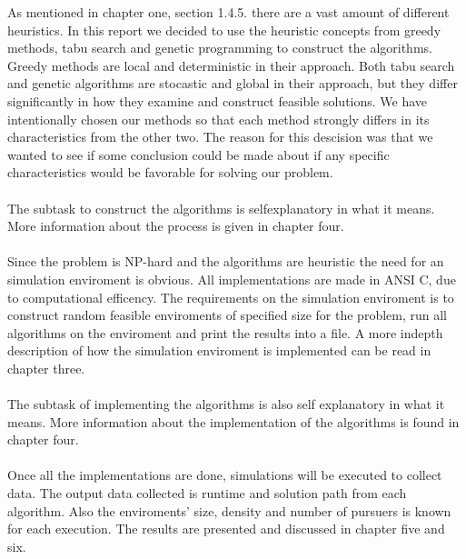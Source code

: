 As mentioned in chapter one, section 1.4.5. there are a vast amount of different heuristics. In this report we decided to use the heuristic concepts from greedy methods, tabu search and genetic programming to construct the algorithms. Greedy methods are local and deterministic in their approach. Both tabu search and genetic algorithms are stocastic and global in their approach, but they differ significantly in how they examine and construct feasible solutions. We have intentionally chosen our methods so that each method strongly differs in its characteristics from the other two. The reason for this descision was that we wanted to see if some conclusion could be made about if any specific characteristics would be favorable for solving our problem.\\
\\The subtask to construct the algorithms is selfexplanatory in what it means. More information about the process is given in chapter four.\\
\\Since the problem is NP-hard and the algorithms are heuristic the need for an simulation enviroment is obvious. All implementations are made in ANSI C, due to computational efficency. The requirements on the simulation enviroment is to construct random feasible enviroments of specified size for the problem, run all algorithms on the enviroment and print the results into a file. A more indepth description of how the simulation enviroment is implemented can be read in chapter three.\\
\\The subtask of implementing the algorithms is also self explanatory in what it means. More information about the implementation of the algorithms is found in chapter four.\\
\\Once all the implementations are done, simulations will be executed to collect data. The output data collected is runtime and solution path from each algorithm. Also the enviroments' size, density and number of pursuers is known for each execution. The results are presented and discussed in chapter five and six.
 